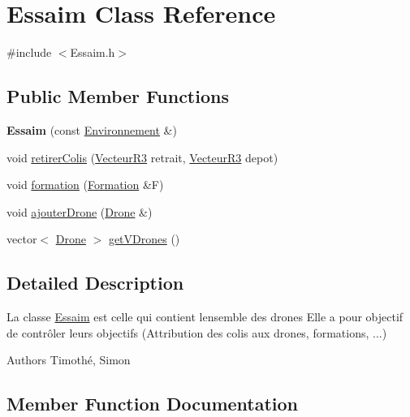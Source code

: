 \hypertarget{class_essaim}{}\section{Essaim Class Reference}
\label{class_essaim}


{\ttfamily \#include $<$Essaim.\+h$>$}

\subsection*{Public Member Functions}
\begin{DoxyCompactItemize}
\item 
\mbox{\label{class_essaim_a0c5b7909522e23b232d0d4c8c5c738c4}} 
{\bfseries Essaim} (const \mbox{\hyperlink{class_environnement}{Environnement}} \&)
\item 
void \mbox{\hyperlink{class_essaim_a6e5a1427a3bdd7b7c7a29f07b54a5ae7}{retirer\+Colis}} (\mbox{\hyperlink{class_vecteur_r3}{Vecteur\+R3}} retrait, \mbox{\hyperlink{class_vecteur_r3}{Vecteur\+R3}} depot)
\item 
void \mbox{\hyperlink{class_essaim_acca17cbaea8479e9a6e1809e09bf913a}{formation}} (\mbox{\hyperlink{class_formation}{Formation}} \&F)
\item 
void \mbox{\hyperlink{class_essaim_a267e5067cbc6f33f3fa2b7e4e4a742a9}{ajouter\+Drone}} (\mbox{\hyperlink{class_drone}{Drone}} \&)
\item 
vector$<$ \mbox{\hyperlink{class_drone}{Drone}} $>$ \mbox{\hyperlink{class_essaim_a50c44589919f13f81cdb86f2cdf0e508}{get\+V\+Drones}} ()
\end{DoxyCompactItemize}


\subsection{Detailed Description}
La classe \mbox{\hyperlink{class_essaim}{Essaim}} est celle qui contient l\textquotesingle{}ensemble des drones Elle a pour objectif de contrôler leurs objectifs (Attribution des colis aux drones, formations, ...)

\begin{DoxyAuthor}{Authors}
Timothé, Simon 
\end{DoxyAuthor}


\subsection{Member Function Documentation}
\mbox{\label{class_essaim_a267e5067cbc6f33f3fa2b7e4e4a742a9}} 
